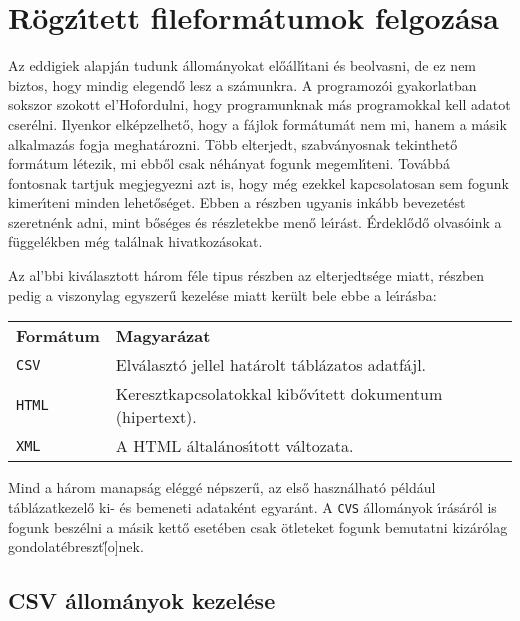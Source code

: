 \section{R\"ogz\'{\i}tett fileform\'atumok felgoz\'asa}

Az eddigiek alapj\'an tudunk \'allom\'anyokat el\H{o}\'all\'{\i}tani \'es beolvasni, de ez 
nem biztos, hogy mindig elegend\H{o} lesz a sz\'amunkra. A programoz\'oi gyakorlatban sokszor 
szokott el'H{o}fordulni, hogy programunknak m\'as programokkal kell adatot cser\'elni. Ilyenkor 
elk\'epzelhet\H{o}, hogy a f\'ajlok form\'atum\'at nem mi, hanem a m\'asik alkalmaz\'as fogja 
meghat\'arozni. T\"obb elterjedt, szabv\'anyosnak tekinthet\H{o} form\'atum l\'etezik, mi ebb\H{o}l 
csak n\'eh\'anyat fogunk megeml\'{\i}teni. Tov\'abb\'a fontosnak tartjuk megjegyezni azt is, hogy 
m\'eg ezekkel kapcsolatosan sem fogunk kimer\'{\i}teni minden lehet\H{o}s\'eget. Ebben a r\'eszben 
ugyanis ink\'abb bevezet\'est szeretn\'enk adni, mint b\H{o}s\'eges \'es r\'eszletekbe men\H{o} 
le\'{\i}r\'ast. \'Erdekl\H{o}d\H{o} olvas\'oink a f\"uggel\'ekben m\'eg tal\'alnak hivatkoz\'asokat.
 
Az al'bbi kiv\'alasztott h\'arom f\'ele tipus r\'eszben az elterjedts\'ege miatt, r\'eszben pedig a 
viszonylag egyszer\H{u} kezel\'ese miatt ker\"ult bele ebbe a le\'{\i}r\'asba:

\begin{center}
   \begin{tabular}{ll}
   {\bf Form\'atum} & {\bf Magyar\'azat} \\
   {\tt CSV} & Elv\'alaszt\'o jellel hat\'arolt t\'abl\'azatos adatf\'ajl. \\
   {\tt HTML} &  Keresztkapcsolatokkal kib\H{o}v\'{\i}tett dokumentum (hipertext).\\
   {\tt XML} & A HTML \'altal\'anos\'{\i}tott v\'altozata. \\
   \end {tabular}
\end{center}

\noindent Mind a h\'arom manaps\'ag el\'egg\'e n\'epszer\H{u}, az els\H{o} haszn\'alhat\'o 
p\'eld\'aul t\'abl\'azatkezel\H{o} ki- \'es bemeneti adatak\'ent egyar\'ant. A {\tt CVS} 
\'allom\'anyok \'{\i}r\'as\'ar\'ol is fogunk besz\'elni a m\'asik kett\H{o} eset\'eben 
csak \"otleteket fogunk bemutatni kiz\'ar\'olag gondolat\'ebreszt\H[o]nek.

\subsection{CSV \'allom\'anyok kezel\'ese}

